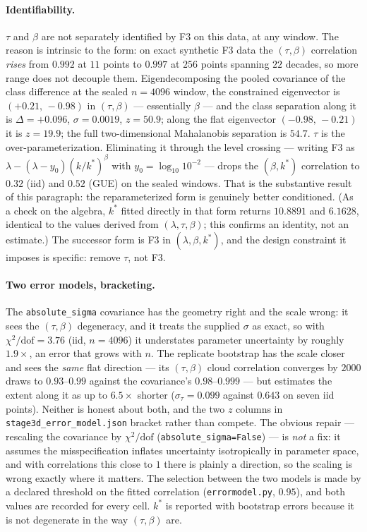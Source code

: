 \documentclass[11pt]{article}
\newcommand{\kstar}{k^{*}}
\begin{document}
\paragraph{Identifiability.} $\tau$ and $\beta$ are not separately identified by F3 on this
data, at any window. The reason is intrinsic to the form: on exact synthetic F3 data the
$(\tau,\beta)$ correlation \emph{rises} from $0.992$ at $11$ points to $0.997$ at $256$ points
spanning $22$ decades, so more range does not decouple them. Eigendecomposing the pooled
covariance of the class difference at the sealed $n=4096$ window, the constrained eigenvector
is $(+0.21,\,-0.98)$ in $(\tau,\beta)$ --- essentially $\beta$ --- and the class separation
along it is $\Delta=+0.096$, $\sigma=0.0019$, $z=50.9$; along the flat eigenvector
$(-0.98,\,-0.21)$ it is $z=19.9$; the full two-dimensional Mahalanobis separation is $54.7$.
$\tau$ is the over-parameterization. Eliminating it through the level crossing --- writing F3
as $\lambda-(\lambda-y_0)(k/\kstar)^{\beta}$ with $y_0=\log_{10}10^{-2}$ --- drops the
$(\beta,\kstar)$ correlation to $0.32$ (iid) and $0.52$ (GUE) on the sealed windows. That is
the substantive result of this paragraph: the reparameterized form is genuinely better
conditioned. (As a check on the algebra, $\kstar$ fitted directly in that form returns
$10.8891$ and $6.1628$, identical to the values derived from $(\lambda,\tau,\beta)$; this
confirms an identity, not an estimate.) The successor form is F3 in $(\lambda,\beta,\kstar)$,
and the design constraint it imposes is specific: remove $\tau$, not F3.

\paragraph{Two error models, bracketing.} The \texttt{absolute\_sigma} covariance has the
geometry right and the scale wrong: it sees the $(\tau,\beta)$ degeneracy, and it treats the
supplied $\sigma$ as exact, so with $\chi^2/\mathrm{dof}=3.76$ (iid, $n=4096$) it understates
parameter uncertainty by roughly $1.9\times$, an error that grows with $n$. The replicate
bootstrap has the scale closer and sees the \emph{same} flat direction --- its $(\tau,\beta)$
cloud correlation converges by $2000$ draws to $0.93$--$0.99$ against the covariance's
$0.98$--$0.999$ --- but estimates the extent along it as up to $6.5\times$ shorter
($\sigma_\tau=0.099$ against $0.643$ on seven iid points). Neither is honest about both, and
the two $z$ columns in \texttt{stage3d\_error\_model.json} bracket rather than compete. The
obvious repair --- rescaling the covariance by $\chi^2/\mathrm{dof}$
(\texttt{absolute\_sigma=False}) --- is \emph{not} a fix: it assumes the misspecification
inflates uncertainty isotropically in parameter space, and with correlations this close to $1$
there is plainly a direction, so the scaling is wrong exactly where it matters. The selection
between the two models is made by a declared threshold on the fitted correlation
(\texttt{errormodel.py}, $0.95$), and both values are recorded for every cell. $\kstar$ is
reported with bootstrap errors because it is not degenerate in the way $(\tau,\beta)$ are.
\end{document}
